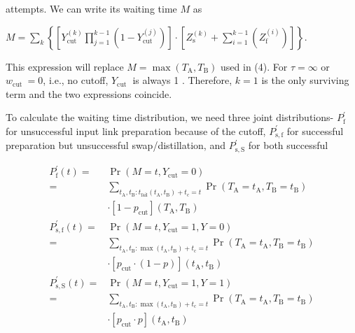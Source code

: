 \documentclass[10pt]{article}
\begin{document}
attempts. We can write its waiting time $M$ as

$M=\sum_{k}\left\{\left[Y_{\text {cut }}^{(k)} \prod_{j=1}^{k-1}\left(1-Y_{\text {cut }}^{(j)}\right)\right] \cdot\left[Z_{\mathrm{s}}^{(k)}+\sum_{i=1}^{k-1}\left(Z_{\mathrm{f}}^{(i)}\right)\right]\right\}$.

This expression will replace $M=\max \left(T_{\mathrm{A}}, T_{\mathrm{B}}\right)$ used in (4). For $\tau=\infty$ or $w_{\text {cut }}=0$, i.e., no cutoff, $Y_{\text {cut }}$ is always 1 . Therefore, $k=1$ is the only surviving term and the two expressions coincide.

To calculate the waiting time distribution, we need three joint distributions- $P_{\mathrm{f}}^{\prime}$ for unsuccessful input link preparation because of the cutoff, $P_{\mathrm{s}, \mathrm{f}}^{\prime}$ for successful preparation but unsuccessful swap/distillation, and $P_{\mathrm{s}, \mathrm{S}}^{\prime}$ for both successful

$$
\begin{aligned}
P_{\mathrm{f}}^{\prime}(t)= & \operatorname{Pr}\left(M=t, Y_{\mathrm{cut}}=0\right) \\
= & \sum_{t_{\mathrm{A}}, t_{\mathrm{B}}: t_{\mathrm{fail}}\left(t_{\mathrm{A}}, t_{\mathrm{B}}\right)+t_{\mathrm{c}}=t} \operatorname{Pr}\left(T_{\mathrm{A}}=t_{\mathrm{A}}, T_{\mathrm{B}}=t_{\mathrm{B}}\right) \\
& \cdot\left[1-p_{\mathrm{cut}}\right]\left(T_{\mathrm{A}}, T_{\mathrm{B}}\right) \\
P_{\mathrm{s}, \mathrm{f}}^{\prime}(t)= & \operatorname{Pr}\left(M=t, Y_{\mathrm{cut}}=1, Y=0\right) \\
= & \sum_{t_{\mathrm{A}}, t_{\mathrm{B}}: \max \left(t_{\mathrm{A}}, t_{\mathrm{B}}\right)+t_{\mathrm{c}}=t} \operatorname{Pr}\left(T_{\mathrm{A}}=t_{\mathrm{A}}, T_{\mathrm{B}}=t_{\mathrm{B}}\right) \\
& \cdot\left[p_{\mathrm{cut}} \cdot(1-p)\right]\left(t_{\mathrm{A}}, t_{\mathrm{B}}\right) \\
P_{\mathrm{s}, \mathrm{S}}^{\prime}(t)= & \operatorname{Pr}\left(M=t, Y_{\mathrm{cut}}=1, Y=1\right) \\
= & \sum_{t_{\mathrm{A}}, t_{\mathrm{B}}: \max \left(t_{\mathrm{A}}, t_{\mathrm{B}}\right)+t_{\mathrm{c}}=t} \operatorname{Pr}\left(T_{\mathrm{A}}=t_{\mathrm{A}}, T_{\mathrm{B}}=t_{\mathrm{B}}\right) \\
& \cdot\left[p_{\mathrm{cut}} \cdot p\right]\left(t_{\mathrm{A}}, t_{\mathrm{B}}\right)
\end{aligned}
$$
\end{document}
